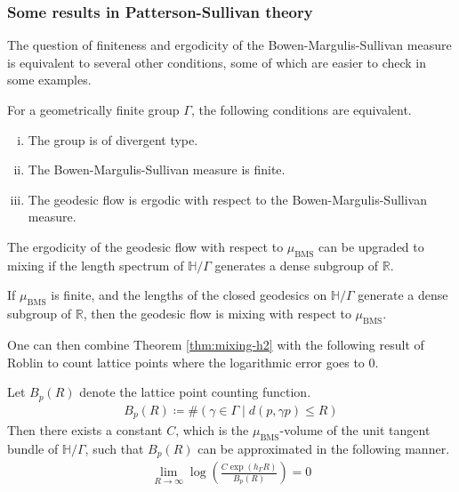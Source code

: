 
\subsubsection{Some results in Patterson-Sullivan theory}
\label{sec:some-results-patt}

The question of finiteness and ergodicity of the Bowen-Margulis-Sullivan measure is equivalent to several other conditions, some of which are easier to check in some examples.

\begin{theorem}
  \label{thm:hts-dich}
  For a geometrically finite group $\Gamma$, the following conditions are equivalent.
  \begin{enumerate}[(i)]
  \item The group is of divergent type.
  \item The Bowen-Margulis-Sullivan measure is finite.
  \item The geodesic flow is ergodic with respect to the Bowen-Margulis-Sullivan measure.
  \end{enumerate}
\end{theorem}

The ergodicity of the geodesic flow with respect to $\mu_{\mathrm{BMS}}$ can be upgraded to mixing if the length spectrum of $\mathbb{H}/\Gamma$ generates a dense subgroup of $\mathbb{R}$.

\begin{theorem}
  \label{thm:mixing-h2}
  If $\mu_{\mathrm{BMS}}$ is finite, and the lengths of the closed geodesics on $\mathbb{H}/\Gamma$ generate a dense subgroup of $\mathbb{R}$, then the geodesic flow is mixing with respect to $\mu_{\mathrm{BMS}}$.
\end{theorem}

One can then combine Theorem \ref{thm:mixing-h2} with the following result of Roblin to count lattice points where the logarithmic error goes to $0$.

\begin{theorem}
  \label{thm:counting-h2}
  Let $B_p(R)$ denote the lattice point counting function.
  \begin{align*}
    B_p(R) \coloneqq \#\left( \gamma \in \Gamma \mid d(p, \gamma p) \leq R \right)
  \end{align*}
  Then there exists a constant $C$, which is the $\mu_{\mathrm{BMS}}$-volume of the unit tangent bundle of $\mathbb{H}/\Gamma$, such that $B_p(R)$ can be approximated in the following manner.
  \begin{align*}
    \lim_{R \to \infty} \log\left( \frac{C \exp(h_{\Gamma} R)}{B_p(R)} \right) = 0
  \end{align*}
\end{theorem}

